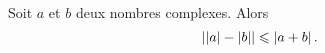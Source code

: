 \documentclass{magnolia}
\begin{document}

\begin{proposition}[utile=-3,nom={Seconde inégalité triangulaire}]
Soit $a$ et $b$ deux nombres complexes. Alors
\[\left|\left|a\right|-\left|b\right|\right|\leqslant\left|a+b\right|.\]
\end{proposition}
\end{document}
